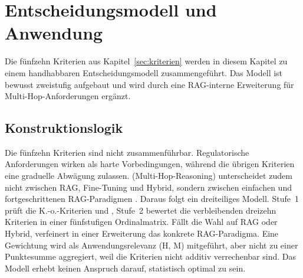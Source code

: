 %
%

\section{Entscheidungsmodell und Anwendung}
\label{sec:katalog}

Die fünfzehn Kriterien aus Kapitel~\ref{sec:kriterien} werden in diesem Kapitel zu einem handhabbaren Entscheidungsmodell zusammengeführt. Das Modell ist bewusst zweistufig aufgebaut und wird durch eine RAG-interne Erweiterung für Multi-Hop-Anforderungen ergänzt.

\subsection{Konstruktionslogik}
\label{sec:matrix-logik}

Die fünfzehn Kriterien sind nicht zusammenführbar. Regulatorische Anforderungen wirken als harte Vorbedingungen, während die übrigen Kriterien eine graduelle Abwägung zulassen.  (Multi-Hop-Reasoning) unterscheidet zudem nicht zwischen RAG, Fine-Tuning und Hybrid, sondern zwischen einfachen und fortgeschrittenen RAG-Pa\-ra\-dig\-men \autocite[10f.]{Gao.2024}. Daraus folgt ein dreiteiliges Modell. Stufe~1 prüft die K.-o.-Kriterien  und , Stufe~2 bewertet die verbleibenden dreizehn Kriterien in einer fünfstufigen Ordinalmatrix. Fällt die Wahl auf RAG oder Hybrid, verfeinert  in einer Erweiterung das konkrete RAG-Pa\-ra\-dig\-ma. Eine Gewichtung wird als Anwendungsrelevanz (H, M) mitgeführt, aber nicht zu einer Punktesumme aggregiert, weil die Kriterien nicht additiv verrechenbar sind. Das Modell erhebt keinen Anspruch darauf, statistisch optimal zu sein.

